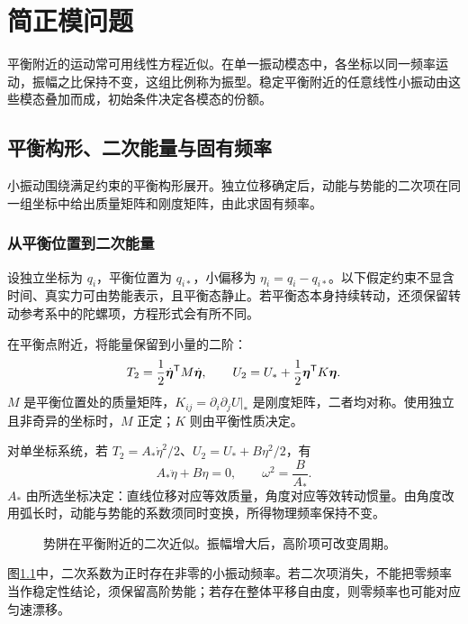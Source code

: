 \chapter{简正模问题}


平衡附近的运动常可用线性方程近似。在单一振动模态中，各坐标以同一频率运动，振幅之比保持不变，这组比例称为振型。稳定平衡附近的任意线性小振动由这些模态叠加而成，初始条件决定各模态的份额。



\section{平衡构形、二次能量与固有频率}

小振动围绕满足约束的平衡构形展开。独立位移确定后，动能与势能的二次项在同一组坐标中给出质量矩阵和刚度矩阵，由此求固有频率。



\subsection{从平衡位置到二次能量}
设独立坐标为 $q_i$，平衡位置为 $q_{i*}$，小偏移为 $\eta_i=q_i-q_{i*}$。以下假定约束不显含时间、真实力可由势能表示，且平衡态静止。若平衡态本身持续转动，还须保留转动参考系中的陀螺项，方程形式会有所不同。

在平衡点附近，将能量保留到小量的二阶：
\begin{equation}
T_2=\frac12\dot{\bm{\eta}}^{\mathsf T}M\dot{\bm{\eta}},\qquad
U_2=U_*+\frac12\bm{\eta}^{\mathsf T}K\bm{\eta}.
\label{sup4:eq:d7-energy}
\end{equation}
$M$ 是平衡位置处的质量矩阵，$K_{ij}=\partial_i\partial_jU|_*$ 是刚度矩阵，二者均对称。使用独立且非奇异的坐标时，$M$ 正定；$K$ 则由平衡性质决定。

对单坐标系统，若 $T_2=A_*\dot\eta^2/2$、$U_2=U_*+B\eta^2/2$，有
\[
A_*\ddot\eta+B\eta=0,\qquad \omega^2=\frac B{A_*}.
\]
$A_*$ 由所选坐标决定：直线位移对应等效质量，角度对应等效转动惯量。由角度改用弧长时，动能与势能的系数须同时变换，所得物理频率保持不变。
\begin{figure}[H]\centering
{}
\caption{势阱在平衡附近的二次近似。振幅增大后，高阶项可改变周期。}\label{sup4:fig:d7-potential}
\end{figure}
图\ref{sup4:fig:d7-potential}中，二次系数为正时存在非零的小振动频率。若二次项消失，不能把零频率当作稳定性结论，须保留高阶势能；若存在整体平移自由度，则零频率也可能对应匀速漂移。



